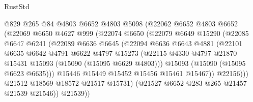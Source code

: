 \begin{lexlean}{RustStd}
\begin{coremodule}
                          @829
                          @265
                          @84
                          @4803
                          @6652
                          @4803
                          @5098
                          (@22062
                            @6652
                            @4803
                            @6652
                            (@22069
                              @6650
                              @4627
                              @999
                              (@22074
                                @6650
                                (@22079
                                  @6649
                                  @15290
                                  (@22085
                                    @6647
                                    @6241
                                    (@22089
                                      @6636
                                      @6645
                                      (@22094
                                        @6636
                                        @6643
                                        @4881
                                        (@22101
                                          @6635
                                          @6642
                                          @4791
                                          @6622
                                          @4797
                                          @15273
                                          (@22115
                                            @4330
                                            @4797
                                            @21870
                                            @15431
                                            @15093
                                            (@15090 (@15095 @6629 @4803)))
                                          @15093
                                          (@15090 (@15095 @6623 @6635)))
                                        @15446
                                        @15449
                                        @15452
                                        @15456
                                        @15461
                                        @15467))
                                    @22156)))
                              @21512
                              @18569
                              @18572
                              @21517
                              @15731)
                            (@21527 @6652 @283 @265 @21457 @21539 @21546))
                          @21539))

\end{coremodule}
\end{lexlean}
